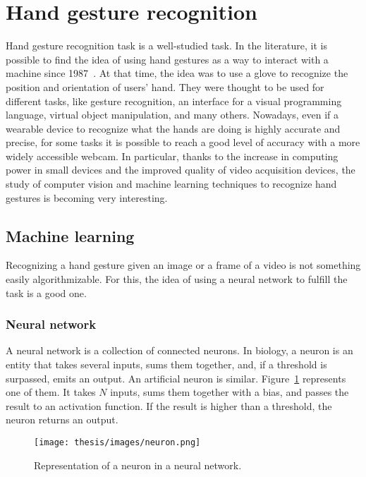 \documentclass[../thesis.tex]{subfiles}
\begin{document}
\section{Hand gesture recognition}
Hand gesture recognition task is a well-studied task. In the literature, it is possible to find the idea of using hand gestures as a way to interact with a machine since 1987~\cite{paper:hand_gesture_interface_device}. At that time, the idea was to use a glove to recognize the position and orientation of users’ hand. They were thought to be used for different tasks, like gesture recognition, an interface for a visual programming language, virtual object manipulation, and many others. Nowadays, even if a wearable device to recognize what the hands are doing is highly accurate and precise, for some tasks it is possible to reach a good level of accuracy with a more widely accessible webcam. In particular, thanks to the increase in computing power in small devices and the improved quality of video acquisition devices, the study of computer vision and machine learning techniques to recognize hand gestures is becoming very interesting.

\subsection{Machine learning}
Recognizing a hand gesture given an image or a frame of a video is not something easily algorithmizable. For this, the idea of using a neural network to fulfill the task is a good one.

\subsubsection{Neural network}
A neural network is a collection of connected neurons. In biology, a neuron is an entity that takes several inputs, sums them together, and, if a threshold is surpassed, emits an output. An artificial neuron is similar. Figure~\ref{fig:neuron} represents one of them. It takes $N$ inputs, sums them together with a bias, and passes the result to an activation function. If the result is higher than a threshold, the neuron returns an output.

\begin{figure}[H]
    \centering
    \texttt{[image: thesis/images/neuron.png]}
    \caption{Representation of a neuron in a neural network.}
    \label{fig:neuron}
\end{figure}
\end{document}
